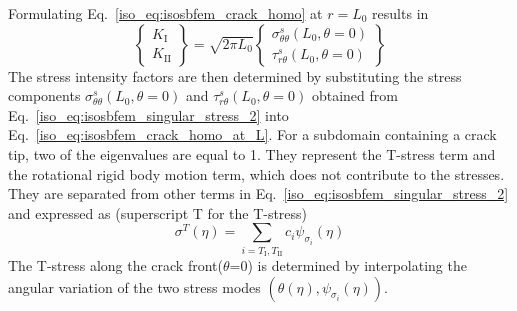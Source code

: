 Formulating Eq.~\ref{iso_eq:isosbfem_crack_homo} at $r=L_0$ results in
\begin{equation}
    \begin{Bmatrix}
        K_{\mathrm{I}}\\
        K_{\mathrm{II}}
    \end{Bmatrix}
    =\sqrt{2\pi L_0}
    \begin{Bmatrix}
        \sigma_{\theta\theta}^s(L_0,\theta=0) \\
        \tau_{r\theta}^s(L_0,\theta=0)
    \end{Bmatrix}
\label{iso_eq:isosbfem_crack_homo_at_L}
\end{equation}
The stress intensity factors are then determined by substituting the stress components $\sigma_{\theta\theta}^s(L_0,\theta=0)$ and $\tau_{r\theta}^s(L_0,\theta=0)$ obtained from Eq.~\ref{iso_eq:isosbfem_singular_stress_2} into Eq.~\ref{iso_eq:isosbfem_crack_homo_at_L}.
For a subdomain containing a crack tip, two of the eigenvalues are equal to 1.
They represent the T-stress term and the rotational rigid body motion term, which does not contribute to the stresses.
They are separated from other terms in Eq.~\ref{iso_eq:isosbfem_singular_stress_2} and expressed as (superscript T for the T-stress)
\begin{equation}
    \sigma^T(\eta) = 
    \sum_{ i=T_{ \mathrm{I} }, T_{ \mathrm{II} } }
    c_i \psi_{\sigma_i} (\eta)
\end{equation}
The T-stress along the crack front($\theta$=0) is determined by interpolating the angular variation of the two stress modes $(\theta(\eta), \psi_{\sigma_i} (\eta))$.